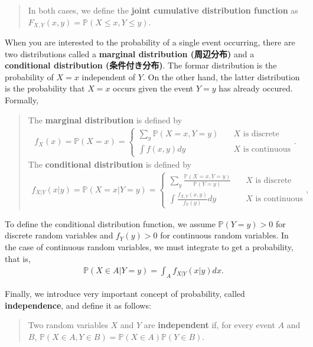 \documentclass[
  12pt,
]{article}
\begin{document}
\begin{quote}
In both cases, we define the \textbf{joint cumulative distribution function} as \(F_{X,Y}(x, y) = \mathbb{P}(X \le x, Y \le y)\).
\end{quote}

When you are interested to the probability of a single event occurring,
there are two distributions called a \textbf{marginal distribution (周辺分布)} and a \textbf{conditional distribution (条件付き分布)}.
The formar distribution is the probability of \(X = x\) independent of \(Y\).
On the other hand,
the latter distribution is the probability that \(X = x\) occurs given the event \(Y = y\) has already occured.
Formally,

\begin{quote}
The \textbf{marginal distribution} is defined by
\begin{align*}
f_X(x) 
= 
\mathbb{P}(X = x)
=
\begin{cases}
\sum_y \mathbb{P}(X = x, Y = y)  &\quad\text{$X$ is discrete} \\
\int f(x, y) dy &\quad\text{$X$ is continuous}
\end{cases}.
\end{align*}
The \textbf{conditional distribution} is defined by
\begin{align*}
f_{X|Y}(x|y)
= 
\mathbb{P}(X = x | Y = y)
= 
\begin{cases}
\sum_y \frac{\mathbb{P}(X = x, Y = y)}{\mathbb{P}(Y = y)}  &\quad\text{$X$ is discrete} \\
\int \frac{f_{X,Y}(x, y)}{f_Y(y)} dy &\quad\text{$X$ is continuous}
\end{cases},
\end{align*}
\end{quote}

To define the conditional distribution function,
we assume \(\mathbb{P}(Y = y) > 0\) for discrete random variables and \(f_Y(y) > 0\) for continuous random variables.
In the case of continuous random variables, we must integrate to get a probability, that is,
\begin{align*}
  \mathbb{P}(X \in A | Y = y) = \int_A f_{X|Y}(x|y) dx.
\end{align*}

Finally, we introduce very important concept of probability, called \textbf{independence}, and define it as follows:

\begin{quote}
Two random variables \(X\) and \(Y\) are \textbf{independent} if, for every event \(A\) and \(B\), \(\mathbb{P}(X \in A, Y \in B) = \mathbb{P}(X \in A) \mathbb{P}(Y \in B)\).
\end{quote}
\end{document}

